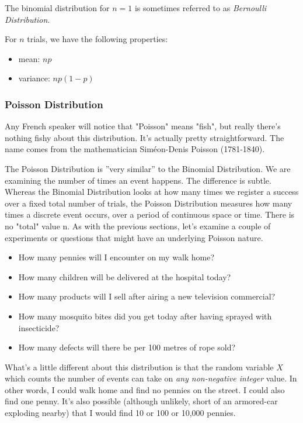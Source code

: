 The binomial distribution for $n = 1$ is sometimes referred to as \emph{Bernoulli Distribution}.

 For $n$ trials, we have the following properties:

 \begin{itemize}
   \item mean: $np$
   \item variance: $n p (1-p)$
 \end{itemize}

\subsubsection{Poisson Distribution}

Any French speaker will notice that "Poisson" means "fish", but really there's nothing fishy about this distribution. It's actually pretty straightforward. The name comes from the mathematician Siméon-Denis Poisson (1781-1840).

The Poisson Distribution is ''very similar'' to the Binomial Distribution. We are examining the number of times an event happens. The difference is subtle. Whereas the Binomial Distribution looks at how many times we register a success over a fixed total number of trials, the Poisson Distribution measures how many times a discrete event occurs, over a period of continuous space or time. There is no "total" value n. As with the previous sections, let's examine a couple of experiments or questions that might have an underlying Poisson nature.

\begin{itemize}
  \item How many pennies will I encounter on my walk home?
  \item How many children will be delivered at the hospital today?
  \item How many products will I sell after airing a new television commercial?
  \item How many mosquito bites did you get today after having sprayed with insecticide?
  \item How many defects will there be per 100 metres of rope sold?
\end{itemize}

What's a little different about this distribution is that the random variable $X$ which counts the number of events can take on \emph{any non-negative integer} value. In other words, I could walk home and find no pennies on the street. I could also find one penny. It's also possible (although unlikely, short of an armored-car exploding nearby) that I would find 10 or 100 or 10,000 pennies.

